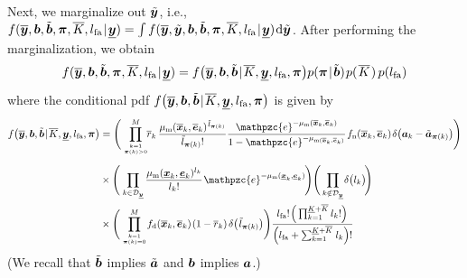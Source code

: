 \documentclass[11pt,a4paper]{article}
\newcommand{\ist}{\hspace*{.3mm}}
\newcommand{\rmv}{\hspace*{-.3mm}}
\newcommand{\cl}[1]{\mathcal{#1}}
\newcommand{\nn}{\nonumber}
\newcommand{\xnew}{\overline{\V{x}}}
\newcommand{\enew}{\overline{\V{e}}}
\newcommand{\rnew}{\overline{r}}
\newcommand{\avt}{\tilde{\V{a}}}
\newcommand{\fd}{f_{\mathrm{d}}}
\begin{document}
Next, we marginalize out $\tilde{\bm{y}}$, i.e., $f(\overline{\V{y}}, \V{b}, \tilde{\V{b}}, \V{\pi}, \overline{K}, l_{\mathrm{fa}} \ist | \ist \underline{\V{y}}) =  \int f(\overline{\V{y}}, \tilde{\V{y}}, \V{b}, \tilde{\V{b}}, \V{\pi}, \overline{K}, l_{\mathrm{fa}} \ist | \ist \underline{\V{y}}) \ist \mathrm{d} \tilde{\V{y}}$. After performing the marginalization, we \vspace{1mm} obtain
\begin{align}
f(\overline{\V{y}}, \V{b}, \tilde{\V{b}}, \V{\pi}, \overline{K}, l_{\mathrm{fa}} \ist | \ist \underline{\V{y}})  =   f\big(\overline{\V{y}}, \V{b}, \tilde{\V{b}} \ist | \ist  \overline{K}, \underline{\V{y}}, l_{\mathrm{fa}}, \V{\pi}\big)   p( \V{\pi} \ist | \ist \tilde{\V{b}}) \ist p( \ist \overline{K} \ist)     \ist\ist p(l_{\mathrm{fa}} ) \label{eq:margInt3}\\[-5mm]
\nn
\end{align}
where the conditional \ac{pdf} $f\big(\overline{\V{y}}, \V{b},\tilde{\V{b}} \ist | \ist  \overline{K},  \underline{\V{y}}, l_{\mathrm{fa}}, \V{\pi}\big)$ is given by
\begin{align}
f\big(\overline{\V{y}}, \V{b},\tilde{\V{b}} \ist | \ist  \overline{K},  \underline{\V{y}}, l_{\mathrm{fa}}, \V{\pi}\big) &= \Bigg(\prod_{k=1 \atop \V{\pi}(k)>0}^M \rmv\rmv\rmv\rmv \rnew_k \ist\ist \frac{\mu_{\mathrm{m}}(\overline{\V{x}}_k,\overline{\V{e}}_k)^{\ist \tilde{l}_{\V{\pi}(k)}}}{\tilde{l}_{ \V{\pi}(k)}!} \frac{\mathpzc{e}^{-\mu_{\mathrm{m}}(\overline{\V{x}}_k,\overline{\V{e}}_k)}}{1-\mathpzc{e}^{-\mu_{\mathrm{m}(\overline{\V{x}}_k,\overline{\V{e}}_k)}}} \ist f_{\mathrm{n}}(\overline{\V{x}}_k, \overline{\V{e}}_k) \ist \delta\big(\V{a}_k-\avt_{\V{\pi}(k)}\big)\Bigg) \nn\\[2mm]
&\times \Bigg ( \ist \prod_{k \in \cl{D}_{\underline{\V{y}}}} \frac{\mu_{\mathrm{m}} (\underline{\V{x}}_k,\underline{\V{e}}_k)^{l_k}}{l_{k}!} \ist \mathpzc{e}^{-\mu_{\mathrm{m}}(\underline{\V{x}}_k,\underline{\V{e}}_k)}  \rmv  \Bigg) \Bigg( \prod_{k \notin \cl{D}_{\underline{\V{y}}}}  \rmv \delta \big(l_{k}\big) \rmv \rmv   \Bigg) \nn\\
&\times  \Bigg(\prod_{k=1 \atop \V{\pi}(k)=0}^M \rmv\rmv \fd(\xnew_k,\enew_k) \ist (1-\rnew_k) \hspace{.5mm} \delta\big(\ist \tilde{l}_{\V{\pi}(k)}  \big) \Bigg) \frac{l_{\mathrm{fa}}! \ist \Big(\prod^{\underline{K} + \overline{K}}_{k=1} l_{k} ! \Big) \ist }{\Big( l_{\mathrm{fa}}  + \sum^{\underline{K} + \overline{K}}_{k=1} \ist l_{k}  \Big)!} 
\label{eq:margInt2}
\end{align}
(We recall that $\tilde{\bm{b}}$ implies $\tilde{\bm{a}}$ and $\bm{b}$ implies $\bm{a}$.)
\end{document}

